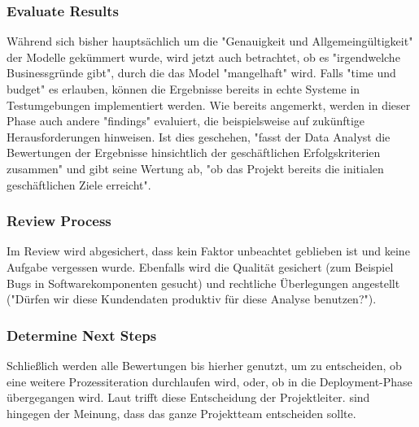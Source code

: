 \subsubsection{Evaluate Results}
Während sich bisher hauptsächlich um die "Genauigkeit und Allgemeingültigkeit" der Modelle gekümmert wurde, wird jetzt auch betrachtet, ob es "irgendwelche Businessgründe gibt", durch die das Model "mangelhaft"\citep[S.~18; eigene Übersetzung]{shearer_crisp-dm_2000} wird. Falls "time und budget"\citep[S.~26]{chapman_crisp-dm_2000} es erlauben, können die Ergebnisse bereits in echte Systeme in Testumgebungen implementiert werden. Wie bereits angemerkt, werden in dieser Phase auch andere "findings" evaluiert, die beispielsweise auf zukünftige Herausforderungen hinweisen.\citep[S.~18]{shearer_crisp-dm_2000} Ist dies geschehen, "fasst der Data Analyst die Bewertungen der Ergebnisse hinsichtlich der geschäftlichen Erfolgskriterien zusammen" und gibt seine Wertung ab, "ob das Projekt bereits die initialen geschäftlichen Ziele erreicht"\citep[S.~18; eigene Übersetzung]{shearer_crisp-dm_2000}.

\subsubsection{Review Process}
Im Review wird abgesichert, dass kein Faktor unbeachtet geblieben ist und keine Aufgabe vergessen wurde. Ebenfalls wird die Qualität gesichert (zum Beispiel Bugs in Softwarekomponenten gesucht) und rechtliche Überlegungen angestellt ("Dürfen wir diese Kundendaten produktiv für diese Analyse benutzen?").

\subsubsection{Determine Next Steps}
Schließlich werden alle Bewertungen bis hierher genutzt, um zu entscheiden, ob eine weitere Prozessiteration durchlaufen wird, oder, ob in die Deployment-Phase übergegangen wird. Laut \citep[S.~18]{shearer_crisp-dm_2000} trifft diese Entscheidung der Projektleiter. \citep[S.~17]{chapman_crisp-dm_2000} sind hingegen der Meinung, dass das ganze Projektteam entscheiden sollte.

